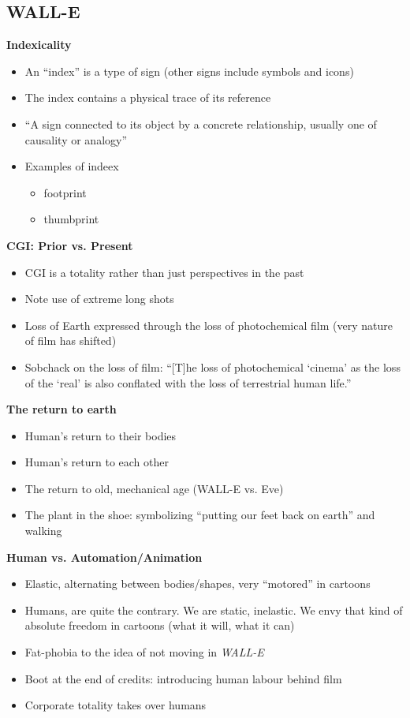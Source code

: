 \documentclass[11pt,fleqn]{book}
\begin{document}
\subsection{WALL-E}
\textbf{Indexicality}
\begin{itemize}
    \item An \enquote{index} is a type of sign (other signs include symbols and icons)
    \item The index contains a physical trace of its reference
    \item \enquote{A sign connected to its object by a
concrete relationship, usually one of
causality or analogy}
    \item Examples of indeex
    \begin{itemize}
        \item footprint
        \item thumbprint
    \end{itemize}
\end{itemize}
\textbf{CGI: Prior vs. Present}
\begin{itemize}
    \item CGI is a totality rather than just perspectives in the past
    \item Note use of extreme long shots
    \item Loss of Earth expressed through the loss of photochemical film (very nature of film has shifted)
    \item Sobchack on the loss of film: \enquote{[T]he loss of photochemical ‘cinema’ as
the loss of the ‘real’ is also conflated
with the loss of terrestrial human life.}
\end{itemize}
\textbf{The return to earth}
\begin{itemize}
    \item Human's return to their bodies
    \item Human's return to each other
    \item The return to old, mechanical age (WALL-E vs. Eve)
    \item The plant in the shoe: symbolizing \enquote{putting our feet back on earth} and walking
\end{itemize}
\textbf{Human vs. Automation/Animation}
\begin{itemize}
    \item Elastic, alternating between bodies/shapes, very \enquote{motored} in cartoons
    \item Humans, are quite the contrary. We are static, inelastic. We envy that kind of absolute freedom in cartoons (what it will, what it can)
    \item Fat-phobia to the idea of not moving in \textit{WALL-E}
    \item Boot at the end of credits: introducing human labour behind film
    \item Corporate totality takes over humans
\end{itemize}
\end{document}
